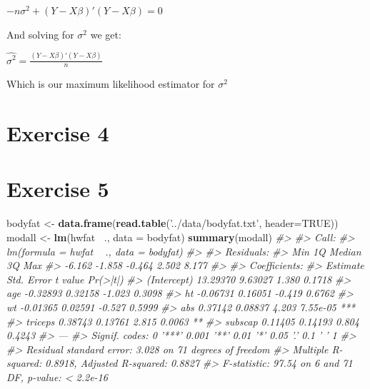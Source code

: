 \documentclass[]{article}
\newenvironment{Shaded}{\begin{snugshade}}{\end{snugshade}}
\newcommand{\CommentTok}[1]{\textcolor[rgb]{0.56,0.35,0.01}{\textit{#1}}}
\newcommand{\DataTypeTok}[1]{\textcolor[rgb]{0.13,0.29,0.53}{#1}}
\newcommand{\KeywordTok}[1]{\textcolor[rgb]{0.13,0.29,0.53}{\textbf{#1}}}
\newcommand{\NormalTok}[1]{#1}
\newcommand{\OperatorTok}[1]{\textcolor[rgb]{0.81,0.36,0.00}{\textbf{#1}}}
\newcommand{\OtherTok}[1]{\textcolor[rgb]{0.56,0.35,0.01}{#1}}
\newcommand{\StringTok}[1]{\textcolor[rgb]{0.31,0.60,0.02}{#1}}
\begin{document}
\(- n \sigma^{2} + (Y - X \beta) \prime (Y - X \beta) = 0\)

And solving for \(\sigma^{2}\) we get:

\(\hat{\sigma^{2}} = \frac{(Y - X \beta) \prime (Y - X \beta)}{n}\)

Which is our maximum likelihood estimator for \(\sigma^2\)

\hypertarget{exercise-4}{%
\section{Exercise 4}\label{exercise-4}}

\newpage

\hypertarget{exercise-5}{%
\section{Exercise 5}\label{exercise-5}}

\begin{Shaded}
\begin{Highlighting}[]
\NormalTok{bodyfat <-}\StringTok{ }\KeywordTok{data.frame}\NormalTok{(}\KeywordTok{read.table}\NormalTok{(}\StringTok{'../data/bodyfat.txt'}\NormalTok{, }\DataTypeTok{header=}\OtherTok{TRUE}\NormalTok{))}
\NormalTok{modall <-}\StringTok{ }\KeywordTok{lm}\NormalTok{(hwfat }\OperatorTok{~}\NormalTok{., }\DataTypeTok{data =}\NormalTok{ bodyfat)}
\KeywordTok{summary}\NormalTok{(modall)}
\CommentTok{#> }
\CommentTok{#> Call:}
\CommentTok{#> lm(formula = hwfat ~ ., data = bodyfat)}
\CommentTok{#> }
\CommentTok{#> Residuals:}
\CommentTok{#>    Min     1Q Median     3Q    Max }
\CommentTok{#> -6.162 -1.858 -0.464  2.502  8.177 }
\CommentTok{#> }
\CommentTok{#> Coefficients:}
\CommentTok{#>             Estimate Std. Error t value Pr(>|t|)    }
\CommentTok{#> (Intercept) 13.29370    9.63027   1.380   0.1718    }
\CommentTok{#> age         -0.32893    0.32158  -1.023   0.3098    }
\CommentTok{#> ht          -0.06731    0.16051  -0.419   0.6762    }
\CommentTok{#> wt          -0.01365    0.02591  -0.527   0.5999    }
\CommentTok{#> abs          0.37142    0.08837   4.203 7.55e-05 ***}
\CommentTok{#> triceps      0.38743    0.13761   2.815   0.0063 ** }
\CommentTok{#> subscap      0.11405    0.14193   0.804   0.4243    }
\CommentTok{#> ---}
\CommentTok{#> Signif. codes:  0 '***' 0.001 '**' 0.01 '*' 0.05 '.' 0.1 ' ' 1}
\CommentTok{#> }
\CommentTok{#> Residual standard error: 3.028 on 71 degrees of freedom}
\CommentTok{#> Multiple R-squared:  0.8918, Adjusted R-squared:  0.8827 }
\CommentTok{#> F-statistic: 97.54 on 6 and 71 DF,  p-value: < 2.2e-16}
\end{Highlighting}
\end{Shaded}
\end{document}

